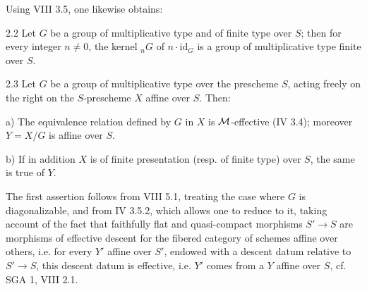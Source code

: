 Using VIII 3.5, one likewise obtains:
\begin{proposition}{2.2}\label{IX.2.2}
Let $G$ be a group of multiplicative type and of finite type over $S$; then for every integer $n\ne0$, the kernel ${}_nG$ of $n\cdot\mathrm{id}_G$ is a group of multiplicative type finite over $S$.
\end{proposition}
\begin{proposition}{2.3}\label{IX.2.3}
Let $G$ be a group of multiplicative type over the prescheme $S$, acting freely on the right on the $S$-prescheme $X$ affine over $S$. Then:

a) The equivalence relation defined by $G$ in $X$ is $\cal M$-effective (IV 3.4); moreover $Y=X/G$ is affine over $S$.

b) If in addition $X$ is of finite presentation (resp. of finite type) over $S$, the same is true of $Y$.
\end{proposition}
The first assertion follows from VIII 5.1, treating the case where $G$ is diagonalizable, and from IV 3.5.2, which allows one to reduce to it, taking account of the fact that faithfully flat and quasi-compact morphisms $S'\to S$ are morphisms of effective descent for the fibered category of schemes affine over others, i.e. for every $Y'$ affine over $S'$, endowed with a descent datum relative to $S'\to S$, this descent datum is effective, i.e. $Y'$ comes from a $Y$ affine over $S$, cf. SGA 1, VIII 2.1.

